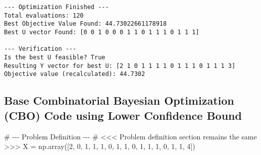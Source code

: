 \documentclass[
  letterpaper,
  DIV=11,
  numbers=noendperiod]{scrartcl}
\newenvironment{Shaded}{\begin{snugshade}}{\end{snugshade}}
\newcommand{\CommentTok}[1]{\textcolor[rgb]{0.37,0.37,0.37}{#1}}
\newcommand{\DecValTok}[1]{\textcolor[rgb]{0.68,0.00,0.00}{#1}}
\newcommand{\NormalTok}[1]{\textcolor[rgb]{0.00,0.23,0.31}{#1}}
\newcommand{\OperatorTok}[1]{\textcolor[rgb]{0.37,0.37,0.37}{#1}}
\begin{document}
\begin{verbatim}
--- Optimization Finished ---
Total evaluations: 120
Best Objective Value Found: 44.73022661178918
Best U vector Found: [0 0 1 0 0 0 1 1 0 1 1 1 0 1 1 1]

--- Verification ---
Is the best U feasible? True
Resulting Y vector for best U: [2 1 0 1 1 1 1 0 1 1 1 0 1 1 1 3]
Objective value (recalculated): 44.7302
\end{verbatim}

\subsection{Base Combinatorial Bayesian Optimization (CBO) Code using
Lower Confidence
Bound}\label{base-combinatorial-bayesian-optimization-cbo-code-using-lower-confidence-bound}

\begin{Shaded}
\begin{Highlighting}[]
\CommentTok{\# {-}{-}{-} Problem Definition {-}{-}{-}}
\CommentTok{\# \textless{}\textless{}\textless{} Problem definition section remains the same \textgreater{}\textgreater{}\textgreater{}}
\NormalTok{X }\OperatorTok{=}\NormalTok{ np.array([}\DecValTok{2}\NormalTok{, }\DecValTok{0}\NormalTok{, }\DecValTok{1}\NormalTok{, }\DecValTok{1}\NormalTok{, }\DecValTok{1}\NormalTok{, }\DecValTok{0}\NormalTok{, }\DecValTok{1}\NormalTok{, }\DecValTok{1}\NormalTok{, }\DecValTok{0}\NormalTok{, }\DecValTok{1}\NormalTok{, }\DecValTok{1}\NormalTok{, }\DecValTok{1}\NormalTok{, }\DecValTok{0}\NormalTok{, }\DecValTok{1}\NormalTok{, }\DecValTok{1}\NormalTok{, }\DecValTok{4}\NormalTok{])}


\end{Highlighting}
\end{Shaded}
\end{document}

